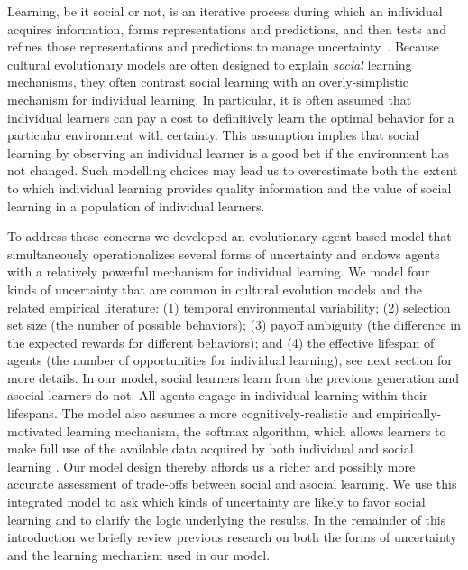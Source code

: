 \documentclass[letterpaper,11.5pt]{scrartcl}
\begin{document}
Learning, be it social or not, is an iterative process during which an individual acquires information, forms representations and predictions, and then tests and refines those representations and predictions to manage uncertainty~\citep{jacobs2011bayesian,clark2013whatever}. Because cultural evolutionary models are often designed to explain \emph{social} learning mechanisms, they often contrast social learning with an overly-simplistic mechanism for individual learning. In particular, it is often assumed that individual learners can pay a cost to definitively learn the optimal behavior for a particular environment with certainty. This assumption implies that social learning by observing an individual learner is a good bet if the environment has not changed. Such modelling choices may lead us to overestimate both the extent to which individual learning provides quality information and the value of social learning in a population of individual learners. %

To address these concerns we developed an evolutionary agent-based model that
simultaneously operationalizes several forms of uncertainty and endows agents
with a relatively powerful mechanism for individual learning. We model four kinds of
uncertainty that are common in cultural evolution models and the related empirical
literature:  (1) temporal environmental variability; (2) selection set size (the number of possible behaviors); (3) payoff ambiguity (the difference in the expected rewards for different behaviors); and (4) the effective lifespan of agents (the number of opportunities for individual learning), see next section for more details. In our model, social learners learn from the previous generation and asocial learners do not. All agents engage in individual learning within their lifespans. The model also assumes a more
cognitively-realistic and empirically-motivated learning mechanism, the softmax algorithm, which allows learners to make full use of the available data acquired by both individual and social learning \citep{SuttonBartoBook}. Our model design thereby affords us a richer and possibly more accurate assessment of trade-offs between social and asocial learning. We use this integrated model to ask which kinds of uncertainty are likely to favor social learning and to clarify the logic underlying the results.
In the remainder of this introduction we briefly review previous research on both the forms of uncertainty and the learning mechanism used in our model. 
\end{document}
